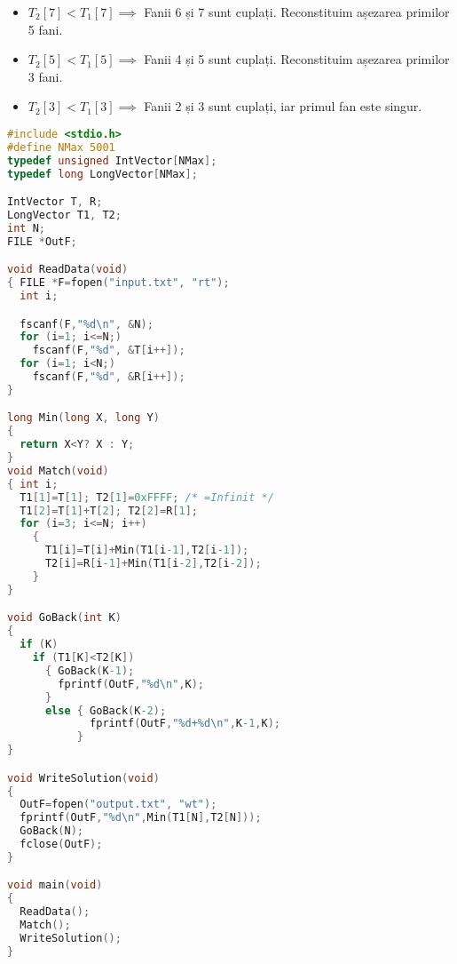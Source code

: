 \begin{itemize}

\item $T_2[7]<T_1[7] \implies$ Fanii 6 și 7 sunt cuplați. Reconstituim
  așezarea primilor 5 fani.

\item $T_2[5]<T_1[5] \implies$ Fanii 4 și 5 sunt cuplați. Reconstituim
  așezarea primilor 3 fani.

\item $T_2[3]<T_1[3] \implies$ Fanii 2 și 3 sunt cuplați, iar primul fan este
  singur.

\end{itemize}

\begin{lstlisting}[language=C]
#include <stdio.h>
#define NMax 5001
typedef unsigned IntVector[NMax];
typedef long LongVector[NMax];

IntVector T, R;
LongVector T1, T2;
int N;
FILE *OutF;

void ReadData(void)
{ FILE *F=fopen("input.txt", "rt");
  int i;

  fscanf(F,"%d\n", &N);
  for (i=1; i<=N;)
    fscanf(F,"%d", &T[i++]);
  for (i=1; i<N;)
    fscanf(F,"%d", &R[i++]);
}

long Min(long X, long Y)
{
  return X<Y? X : Y;
}
void Match(void)
{ int i;
  T1[1]=T[1]; T2[1]=0xFFFF; /* =Infinit */
  T1[2]=T[1]+T[2]; T2[2]=R[1];
  for (i=3; i<=N; i++)
    {
      T1[i]=T[i]+Min(T1[i-1],T2[i-1]);
      T2[i]=R[i-1]+Min(T1[i-2],T2[i-2]);
    }
}

void GoBack(int K)
{
  if (K)
    if (T1[K]<T2[K])
      { GoBack(K-1);
        fprintf(OutF,"%d\n",K);
      }
      else { GoBack(K-2);
             fprintf(OutF,"%d+%d\n",K-1,K);
           }
}

void WriteSolution(void)
{
  OutF=fopen("output.txt", "wt");
  fprintf(OutF,"%d\n",Min(T1[N],T2[N]));
  GoBack(N);
  fclose(OutF);
}

void main(void)
{
  ReadData();
  Match();
  WriteSolution();
}
\end{lstlisting}
